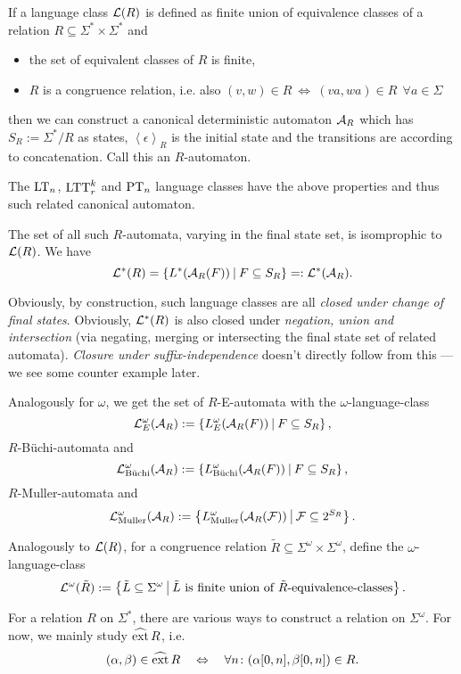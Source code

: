 If a language class $\mathcal{L}(R)$ is defined as finite union of equivalence classes of a relation $R \subseteq \Sigma^* \times \Sigma^*$ and
\begin{itemize}
\item the set of equivalent classes of $R$ is finite,
\item $R$ is a congruence relation, i.e. also $(v,w) \in R \ \Leftrightarrow \ (va,wa) \in R \ \ \forall a \in \Sigma$
\end{itemize}
then we can construct a canonical deterministic automaton $\mathcal{A}_R$ which has $S_R := \Sigma^* / R$ as states, $\left<\epsilon\right>_R$ is the initial state and the transitions are according to concatenation. Call this an $R$-automaton.

The $\textup{\textrm{LT}}_n$, $\textup{\textrm{LTT}}^k_r$ and $\textup{\textrm{PT}}_n$ language classes have the above properties and thus such related canonical automaton.

The set of all such $R$-automata, varying in the final state set, is isomprophic to $\mathcal{L}(R)$. We have
\[ \Lang^*(R) = \Set{L^*(\A_R(F))}{F \subseteq S_R} =: \Lang^*(\A_R) . \]

Obviously, by construction, such language classes are all \emph{closed under change of final states}. Obviously, $\mathcal{L}^*(R)$ is also closed under \emph{negation, union and intersection} (via negating, merging or intersecting the final state set of related automata). \emph{Closure under suffix-independence} doesn't directly follow from this --- we see some counter example later.

\begin{mydef}
Analogously for $\omega$, we get the set of $R$-E-automata with the $\omega$-language-class
\[ \Lang^\omega_E(\A_R) := \Set{L^\omega_E(\A_R(F))}{F \subseteq S_R} , \]
$R$-Büchi-automata and
\[ \Lang^\omega_{\text{Büchi}} (\A_R) := \Set{L^\omega_\text{Büchi}(\A_R(F))}{F \subseteq S_R} , \]
$R$-Muller-automata and
\[ \Lang^\omega_{\text{Muller}} (\A_R) := \Set{L^\omega_\text{Muller}(\A_R(\F))}{\F \subseteq 2^{S_R}} . \]
\end{mydef}

\begin{mydef}
Analogously to $\mathcal{L}(R)$, for a congruence relation $\tilde R \subseteq \Sigma^\omega \times \Sigma^\omega$, define the $\omega$-language-class
\[ \Lang^\omega(\tilde R) := \Set{\tilde L \subseteq \Sigma^\omega}{\text{$\tilde L$ is finite union of $\tilde R$-equivalence-classes}} . \]
\end{mydef}

For a relation $R$ on $\Sigma^*$, there are various ways to construct a relation on $\Sigma^\omega$. For now, we mainly study $\operatorname{\widehat{ext}} R$, i.e.
\[ (\alpha,\beta) \in \dext R \ \ \ \Leftrightarrow \ \ \ \forall n \colon (\alpha[0,n],\beta[0,n]) \in R . \]

